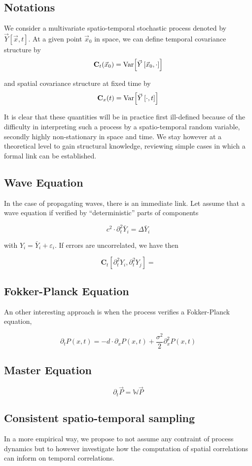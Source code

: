 \subsection{Notations}

We consider a multivariate spatio-temporal stochastic process denoted by $\vec{Y}\left[\vec{x},t\right]$. At a given point $\vec{x}_0$ in space, we can define temporal covariance structure by
\[
\mathbf{C}_t (\vec{x}_0) = \operatorname{Var}\!\left[\vec{Y}\left[\vec{x}_0, \cdot\right]\right]
\]

and spatial covariance structure at fixed time by
\[
\mathbf{C}_x (t) = \operatorname{Var}\!\left[\vec{Y}\left[\cdot, t\right]\right]
\]

It is clear that these quantities will be in practice first ill-defined because of the difficulty in interpreting such a process by a spatio-temporal random variable, secondly highly non-stationary in space and time. We stay however at a theoretical level to gain structural knowledge, reviewing simple cases in which a formal link can be established.


\subsection{Wave Equation}

In the case of propagating waves, there is an immediate link. Let assume that a wave equation if verified by ``deterministic'' parts of components

\[
c^2 \cdot \partial^2_{t} \bar{Y}_i = \Delta \bar{Y}_i
\]

with $Y_i = \bar{Y}_i + \varepsilon_i$. If errors are uncorrelated, we have then

\[
\mathbf{C}_t \left[ \partial^2_t Y_i , \partial^2_t Y_j \right] = 
\]


\subsection{Fokker-Planck Equation}

An other interesting approach is when the process verifies a Fokker-Planck equation, 


\[
\partial_t P(x,t) = - d \cdot \partial_x P(x,t) + \frac{\sigma^2}{2} \partial^2_x P(x,t)
\]


\subsection{Master Equation}


\[
\partial_t \vec{P} = \mathbb{W} \vec{P}
\]



\subsection{Consistent spatio-temporal sampling}

In a more empirical way, we propose to not assume any contraint of process dynamics but to however investigate how the computation of spatial correlations can inform on temporal correlations.







